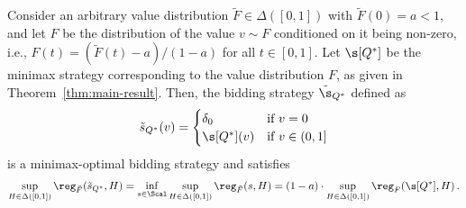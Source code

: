 \begin{proposition}\label{prop:atom-at-0}
	Consider an arbitrary value distribution $\tilde F \in \Delta([0,1])$ with $\tilde F(0) = a < 1$, and let $F$ be the distribution of the value $v \sim F$ conditioned on it being non-zero, i.e., $F(t) = (\tilde F(t) - a)/(1-a)$ for all $t \in [0,1]$. Let $\s[Q^*]$ be the minimax strategy corresponding to the value distribution $F$, as given in Theorem~\ref{thm:main-result}. Then, the bidding strategy $\tilde \s_{Q^*}$ defined as
	\begin{align*}
		\tilde s_{Q^*}(v) = \begin{cases}
			\delta_0 &\text{if } v = 0\\
			\s[Q^*](v) &\text{if } v \in (0,1]\\
		\end{cases}
	\end{align*}
	is a minimax-optimal bidding strategy and satisfies
	\begin{align*}
		\sup_{H \in \Delta([0,1])} \reg_{\tilde F}(\tilde s_{Q^*}, H) = \inf_{s \in \Scal} \sup_{H \in \Delta([0,1])} \reg_{\tilde F}(s, H) = (1 - a) \cdot \sup_{H \in \Delta([0,1])} \reg_F(\s[Q^*], H)\,.
	\end{align*}
\end{proposition}

